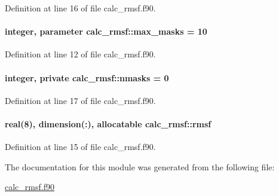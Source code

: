 Definition at line 16 of file calc\-\_\-rmsf.\-f90.

\hypertarget{classcalc__rmsf_a08de58a289bd52a0d7d467bb8d8d34e0}{
\paragraph[{max\-\_\-masks}]{\setlength{\rightskip}{0pt plus 5cm}integer, parameter calc\-\_\-rmsf\-::max\-\_\-masks = 10}}\label{classcalc__rmsf_a08de58a289bd52a0d7d467bb8d8d34e0}


Definition at line 12 of file calc\-\_\-rmsf.\-f90.

\hypertarget{classcalc__rmsf_a9eb2efc6c8d013ed5ec5d5d654d9e881}{
\paragraph[{nmasks}]{\setlength{\rightskip}{0pt plus 5cm}integer, private calc\-\_\-rmsf\-::nmasks = 0\hspace{0.3cm}{\ttfamily [private]}}}\label{classcalc__rmsf_a9eb2efc6c8d013ed5ec5d5d654d9e881}


Definition at line 17 of file calc\-\_\-rmsf.\-f90.

\hypertarget{classcalc__rmsf_aee12c14d0b99212fcc8d411a3733e0e0}{
\paragraph[{rmsf}]{\setlength{\rightskip}{0pt plus 5cm}real(8), dimension(\-:), allocatable calc\-\_\-rmsf\-::rmsf}}\label{classcalc__rmsf_aee12c14d0b99212fcc8d411a3733e0e0}


Definition at line 15 of file calc\-\_\-rmsf.\-f90.



The documentation for this module was generated from the following file\-:\begin{DoxyCompactItemize}
\item 
\hyperlink{calc__rmsf_8f90}{calc\-\_\-rmsf.\-f90}\end{DoxyCompactItemize}
